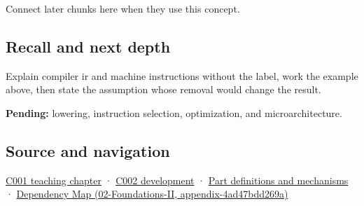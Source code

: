Connect later chunks here when they use this concept.

\subsection{Recall and next depth}\label{appendix-942ad41afb30-recall-and-next-depth}

Explain compiler ir and machine instructions without the label, work the example above, then state the assumption whose removal would change the result.

\textbf{Pending:} lowering, instruction selection, optimization, and microarchitecture.

\subsection{Source and navigation}\label{appendix-942ad41afb30-source-and-navigation}

\hyperref[01-foundations-i-ch001-from-a-signal-to-an-interpretation]{C001 teaching chapter} · \hyperref[01-foundations-i-ch001-arithmetic-becomes-a-policy]{C002 development} · \hyperref[appendix-fd090d982a15]{Part definitions and mechanisms} · \href{../02-Foundations-II/main.pdf\#nameddest=appendix-4ad47bdd269a}{Dependency Map (02-Foundations-II, appendix-4ad47bdd269a)}
